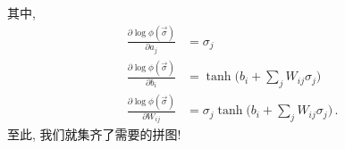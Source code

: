 \documentclass[10pt]{article}
\begin{document}
其中,
\begin{align}
\frac{\partial\log\phi(\vec{\sigma})}{\partial a_{j}} & = \sigma_{j} \nonumber \\
\frac{\partial\log\phi(\vec{\sigma})}{\partial b_{i}} & = \tanh{\Big(b_{i}+\sum_{j}W_{ij}\sigma_{j}\Big)} \nonumber \\
\frac{\partial\log\phi(\vec{\sigma})}{\partial W_{ij}} & = \sigma_{j} \tanh{\Big(b_{i}+\sum_{j}W_{ij}\sigma_{j}\Big)}\,.
\end{align}
至此, 我们就集齐了需要的拼图!
\end{document}
